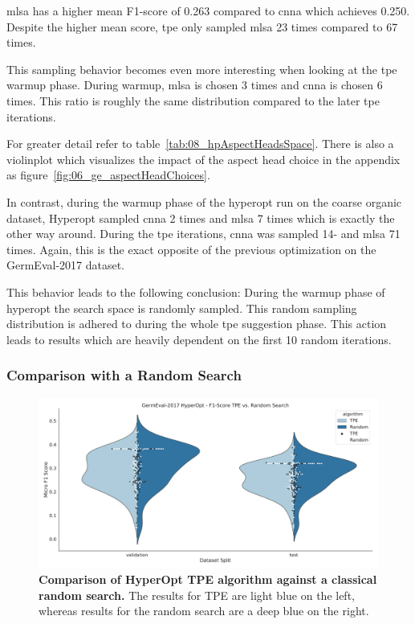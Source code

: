 \gls{mlsa} has a higher mean F1-score of 0.263 compared to \gls{cnna} which achieves 0.250. Despite the higher mean score, \gls{tpe} only sampled \gls{mlsa} 23 times compared to 67 times.

This sampling behavior becomes even more interesting when looking at the \gls{tpe} warmup phase. During warmup, \gls{mlsa} is chosen 3 times and \gls{cnna} is chosen 6 times. This ratio is roughly the same distribution compared to the later \gls{tpe} iterations. 

For greater detail refer to table~\ref{tab:08_hpAspectHeadsSpace}. There is also a violinplot which visualizes the impact of the aspect head choice in the appendix as figure~\ref{fig:06_ge_aspectHeadChoices}.
\medskip

In contrast, during the warmup phase of the hyperopt run on the coarse organic dataset, Hyperopt sampled \gls{cnna} 2 times and \gls{mlsa} 7 times which is exactly the other way around. During the \gls{tpe} iterations, \gls{cnna} was sampled 14- and \gls{mlsa} 71 times. Again, this is the exact opposite of the previous optimization on the GermEval-2017 dataset.
\medskip

This behavior leads to the following conclusion: During the warmup phase of hyperopt the search space is randomly sampled. This random sampling distribution is adhered to during the whole \gls{tpe} suggestion phase. This action leads to results which are heavily dependent on the first 10 random iterations.

\subsubsection*{Comparison with a Random Search}

\begin{figure}[ht]
    \centering
    \includegraphics[width=\textwidth]{figures/06_results/06_hp_ge_vio_tpeRand}
    \caption{\textbf{Comparison of HyperOpt TPE algorithm against a classical random search.} The results for TPE are light blue on the left, whereas results for the random search are a deep blue on the right.}
    \label{fig:06_HpOptimTpe_Rand}
\end{figure}

